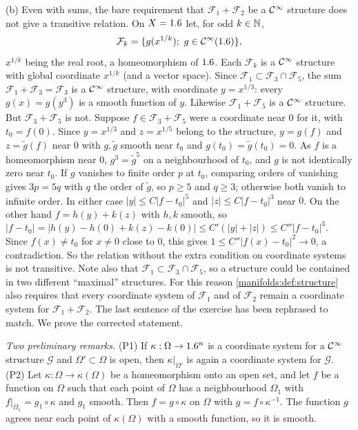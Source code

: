 (b) Even with sums, the bare requirement that $\mathcal F_1+\mathcal F_2$ be a $\mathcal{C}^\infty$ structure
does not give a transitive relation. On $X=1.6$ let, for odd
$k\in\mathbb{N}$,
\begin{equation*}
\mathcal F_k=\{g(x^{1/k});\ g\in\CI(\R)\},
\end{equation*}
$x^{1/k}$ being the real root, a homeomorphism of $1.6$. Each $\mathcal F_k$ is a $\mathcal{C}^\infty$
structure with global coordinate $x^{1/k}$ (and a vector space). Since
$\mathcal F_1\subset\mathcal F_3\cap\mathcal F_5$, the sum $\mathcal F_1+\mathcal F_3=\mathcal F_3$ is a
$\mathcal{C}^\infty$ structure, with coordinate $y=x^{1/3}$: every $g(x)=g(y^3)$ is a smooth function
of $y$. Likewise $\mathcal F_1+\mathcal F_5$ is a $\mathcal{C}^\infty$ structure. But
$\mathcal F_3+\mathcal F_5$ is not. Suppose $f\in\mathcal F_3+\mathcal F_5$ were a
coordinate near $0$ for it, with $t_0=f(0)$. Since $y=x^{1/3}$ and $z=x^{1/5}$ belong to the
structure, $y=g(f)$ and $z=\tilde g(f)$ near $0$ with $g,\tilde g$ smooth near $t_0$ and
$g(t_0)=\tilde g(t_0)=0$. As $f$ is a homeomorphism near $0$, $g^3=\tilde g^5$ on a
neighbourhood of $t_0$, and $g$ is not identically zero near $t_0$. If $g$ vanishes to
finite order $p$ at $t_0$, comparing orders of vanishing gives $3p=5q$ with $q$ the order
of $\tilde g$, so $p\ge5$ and $q\ge3$; otherwise both vanish to infinite order. In either case
$|y|\le C|f-t_0|^5$ and $|z|\le C|f-t_0|^3$ near $0$. On the other hand
$f=h(y)+k(z)$ with $h,k$ smooth, so
$|f-t_0|=|h(y)-h(0)+k(z)-k(0)|\le C'(|y|+|z|)\le C''|f-t_0|^3$. Since $f(x)\ne t_0$ for
$x\ne0$ close to $0$, this gives $1\le C''|f(x)-t_0|^2\to0$, a contradiction. So the
relation without the extra condition on coordinate systems is not transitive. Note also
that $\mathcal F_1\subset\mathcal F_3\cap\mathcal F_5$, so a structure could be contained in two
different ``maximal'' structures. For this reason \cref{manifolds:def:structure} also
requires that every coordinate system of $\mathcal F_1$ and of $\mathcal F_2$ remain a coordinate
system for $\mathcal F_1+\mathcal F_2$.
The last sentence of the exercise has been rephrased to match. We prove the
corrected statement.

\emph{Two preliminary remarks.} (P1) If $\kappa:\Omega\to1.6^n$ is a coordinate system for a
$\mathcal{C}^\infty$ structure $\mathcal G$ and $\Omega'\subset\Omega$ is open, then $\kappa|_{\Omega'}$ is
again a coordinate system for $\mathcal G$. (P2) Let $\kappa:\Omega\to\kappa(\Omega)$ be a
homeomorphism onto an open set, and let $f$ be a function on $\Omega$ such that each point of
$\Omega$ has a neighbourhood $\Omega_1$ with $f|_{\Omega_1}=g_1\circ\kappa$ and $g_1$ smooth. Then
$f=g\circ\kappa$ on $\Omega$ with $g=f\circ\kappa^{-1}$. The function $g$ agrees near each
point of $\kappa(\Omega)$ with a smooth function, so it is smooth.

